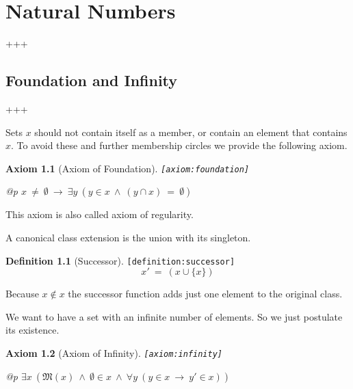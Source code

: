 \documentclass[a4paper,german,10pt,twoside]{book}
\newtheorem{ax}{Axiom}
\theoremstyle{definition}
\newtheorem{defn}{Definition}
\theoremstyle{remark}
\begin{document}

\chapter{Natural Numbers} \label{chapter6} \hypertarget{chapter6}{}

+++

\section{Foundation and Infinity} \label{chapter6_section1} \hypertarget{chapter6_section1}{}
+++

\par
Sets $x$ should not contain itself as a member, or contain an element that contains $x$. 
To avoid these and further membership circles we provide the following axiom.

\begin{ax}[Axiom of Foundation]
\label{axiom:foundation} \hypertarget{axiom:foundation}{}
{\tt \tiny [\verb]axiom:foundation]]}
\mbox{}
\begin{longtable}{{@{\extracolsep{\fill}}p{\linewidth}}}
\centering $x \ \neq \ \emptyset\ \rightarrow\ \exists y\ (y \in x\ \land\ (y \cap x) \ = \ \emptyset)$
\end{longtable}

\end{ax}

This axiom is also called axiom of regularity.


\par
A canonical class extension is the union with its singleton.

\begin{defn}[Successor]
\label{definition:successor} \hypertarget{definition:successor}{}
{\tt \tiny [\verb]definition:successor]]}
$$x' \ = \ (x \cup \{ x \})$$
\end{defn}

Because $x \notin x$ the successor function adds just one element to
the original class.


\par
We want to have a set with an infinite number of elements. So we just postulate its existence.

\begin{ax}[Axiom of Infinity]
\label{axiom:infinity} \hypertarget{axiom:infinity}{}
{\tt \tiny [\verb]axiom:infinity]]}
\mbox{}
\begin{longtable}{{@{\extracolsep{\fill}}p{\linewidth}}}
\centering $\exists x\ (\mathfrak{M}(x)\ \land\ \emptyset \in x\ \land\ \forall y\ (y \in x\ \rightarrow\ y' \in x))$
\end{longtable}

\end{ax}
\end{document}

